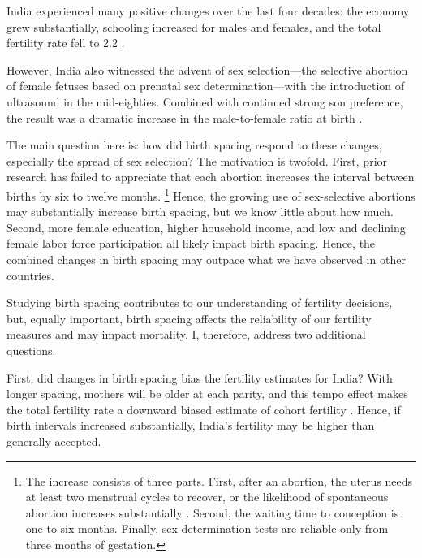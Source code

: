 \documentclass[12pt,letterpaper]{article}
\begin{document}


India experienced many positive changes over the last four decades:
the economy grew substantially,
schooling increased for males and females,
and the total fertility rate fell to 2.2 
\citep{Bosworth2008,Dharmalingam2014,
International-Institute-for-Population-Sciences-IIPS2017}.

However, India also witnessed the advent of sex selection---the selective abortion of 
female fetuses based on prenatal sex determination---with the introduction of ultrasound 
in the mid-eighties.
Combined with continued strong son preference, the result was a dramatic increase in the 
male-to-female ratio at birth
\citep{das_gupta97,Arnold2002,retherford03b,Guilmoto2012,Portner2015b,Jayachandran2017}.


The main question here is: how did birth spacing respond to these changes, especially 
the spread of sex selection? 
The motivation is twofold.
First, prior research has failed to appreciate that each abortion increases the
interval between births by six to twelve months.%
\footnote{
The increase consists of three parts. 
First, after an abortion, the uterus needs at least two menstrual cycles to recover, 
or the likelihood of spontaneous abortion increases substantially \citep{zhou00b}. 
Second, the waiting time to conception is one to six months. 
Finally, sex determination tests are reliable only from three months of gestation. 
}
Hence, the growing use of sex-selective abortions may substantially increase birth spacing, 
but we know little about how much. 
Second, more female education, higher household income, and low and declining female labor 
force participation all likely impact birth spacing. 
Hence, the combined changes in birth spacing may outpace what we have observed in 
other countries.

Studying birth spacing contributes to our understanding of fertility decisions, but, equally 
important, birth spacing affects the reliability of our fertility measures and may 
impact mortality. 
I, therefore, address two additional questions. 

First, did changes in birth spacing bias the fertility estimates for India? 
With longer spacing, mothers will be older at each parity, and this tempo effect makes the 
total fertility rate a downward biased estimate of cohort fertility
\citep{Hotz1997,Bongaarts1999,Ni-Bhrolchain2011}. 
Hence, if birth intervals increased substantially, India's fertility may be higher 
than generally accepted.
\end{document}

